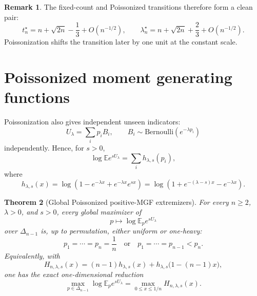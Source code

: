 \documentclass[11pt]{article}
\newtheorem{theorem}{Theorem}[section]
\theoremstyle{definition}
\newtheorem{remark}[theorem]{Remark}
\newcommand{\E}{\mathbb E}
\begin{document}
\begin{remark}
The fixed-count and Poissonized transitions therefore form a clean pair:
\[
  t_n^\star
  =n+\sqrt{2n}-\frac13+O(n^{-1/2}),
  \qquad
  \lambda_n^\star
  =n+\sqrt{2n}+\frac23+O(n^{-1/2}).
\]
Poissonization shifts the transition later by one unit at the constant scale.
\end{remark}

\section{Poissonized moment generating functions}

Poissonization also gives independent unseen indicators:
\[
  U_\lambda=\sum_i p_i B_i,
  \qquad B_i\sim\mathrm{Bernoulli}(e^{-\lambda p_i})
\]
independently. Hence, for $s>0$,
\[
  \log \E e^{sU_\lambda}
  =\sum_i h_{\lambda,s}(p_i),
\]
where
\[
  h_{\lambda,s}(x)=\log\left(1-e^{-\lambda x}+e^{-\lambda x}e^{sx}\right)
  =\log\left(1+e^{-(\lambda-s)x}-e^{-\lambda x}\right).
\]

\begin{theorem}[Global Poissonized positive-MGF extremizers]\label{thm:poisson-mgf}
For every $n\ge2$, $\lambda>0$, and $s>0$, every global maximizer of
\[
  p\mapsto \log\E_p e^{sU_\lambda}
\]
over $\Delta_{n-1}$ is, up to permutation, either uniform or one-heavy:
\[
  p_1=\cdots=p_n=\frac1n
  \quad\text{or}\quad
  p_1=\cdots=p_{n-1}<p_n.
\]
Equivalently, with
\[
  H_{n,\lambda,s}(x)=(n-1)h_{\lambda,s}(x)+h_{\lambda,s}\bigl(1-(n-1)x\bigr),
\]
one has the exact one-dimensional reduction
\[
  \max_{p\in\Delta_{n-1}}\log\E_p e^{sU_\lambda}
  =\max_{0\le x\le1/n}H_{n,\lambda,s}(x).
\]
\end{theorem}
\end{document}
